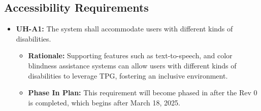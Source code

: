 \documentclass[12pt]{article}
\begin{document}
\subsection{Accessibility Requirements}
\begin{itemize}
  \item \label{UH-A1} \textbf{UH-A1:} The system shall accommodate users with different kinds of disabilities.
  \begin{itemize}
    \item \textbf{Rationale:} Supporting features such as text-to-speech, and color blindness assistance systems can allow users with different kinds of disabilities to leverage TPG, fostering an inclusive environment.
    \item \textbf{Phase In Plan:} This requirement will become phased in after the Rev 0 is completed, which begins after March 18, 2025.
  \end{itemize}
\end{itemize}
\end{document}

